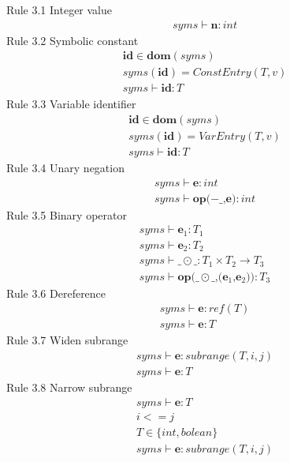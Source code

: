 Rule 3.1 Integer value
\begin{gather*}
    syms \vdash \textbf{n} : int
\end{gather*}
Rule 3.2 Symbolic constant
\begin{gather*}
    \textbf{id} \in \textbf{dom}(syms)\\
    syms(\textbf{id}) = ConstEntry(T, v)\\
    \hline
    syms \vdash \textbf{id} : T
\end{gather*}
Rule 3.3 Variable identifier
\begin{gather*}
    \textbf{id} \in \textbf{dom}(syms)\\
    syms(\textbf{id}) = VarEntry(T, v)\\
    \hline
    syms \vdash \textbf{id} : T
\end{gather*}
Rule 3.4 Unary negation
\begin{gather*}
    syms \vdash \textbf{e} : int\\
    \hline
    syms \vdash \textbf{op($- \_$,e)} : int
\end{gather*}
Rule 3.5 Binary operator
\begin{gather*}
    syms \vdash \textbf{e$_1$} : T_1\\
    syms \vdash \textbf{e$_2$} : T_2\\
    syms \vdash \_ \odot \_ : T_1 \times T_2 \rightarrow T_3\\
    \hline
    syms \vdash \textbf{op($\_ \odot \_ $,(e$_1$,e$_2$))} : T_3
\end{gather*}
Rule 3.6 Dereference
\begin{gather*}
    syms \vdash \textbf{e} : ref(T)\\
    \hline
    syms \vdash \textbf{e} : T
\end{gather*}
Rule 3.7 Widen subrange
\begin{gather*}
    syms \vdash \textbf{e} : subrange(T, i, j)\\
    \hline
    syms \vdash \textbf{e} : T
\end{gather*}
Rule 3.8 Narrow subrange
\begin{gather*}
    syms \vdash \textbf{e} : T\\
    i <= j\\
    T \in \{int,bolean\}\\
    \hline
    syms \vdash \textbf{e} : subrange(T, i, j)
\end{gather*}